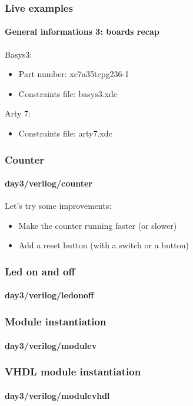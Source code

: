 \documentclass{beamer}
\begin{document}
\begin{frame}\frametitle{Live examples}
\framesubtitle{General informations 3: boards recap}
Basys3:
\begin{itemize}
	\item Part number: xc7a35tcpg236-1
	\item Constraints file: basys3.xdc
\end{itemize}
\vspace{1cm}
Arty 7:
\begin{itemize}
	\item Constraints file: arty7.xdc
\end{itemize}
\end{frame}

\begin{frame}\frametitle{Counter}
\framesubtitle{day3/verilog/counter}

\vspace{0.5cm}
Let's try some improvements:
\begin{itemize}
	\item Make the counter running faster (or slower)
	\item Add a reset button (with a switch or a button)
\end{itemize}

\end{frame}
\begin{frame}\frametitle{Led on and off}
\framesubtitle{day3/verilog/ledonoff}

\vspace{0.5cm}
\end{frame}

\begin{frame}\frametitle{Module instantiation}
\framesubtitle{day3/verilog/modulev}

\vspace{0.1cm}

\end{frame}

\begin{frame}\frametitle{VHDL module instantiation}
\framesubtitle{day3/verilog/modulevhdl}

\vspace{0.1cm}

\end{frame}
\end{document}
